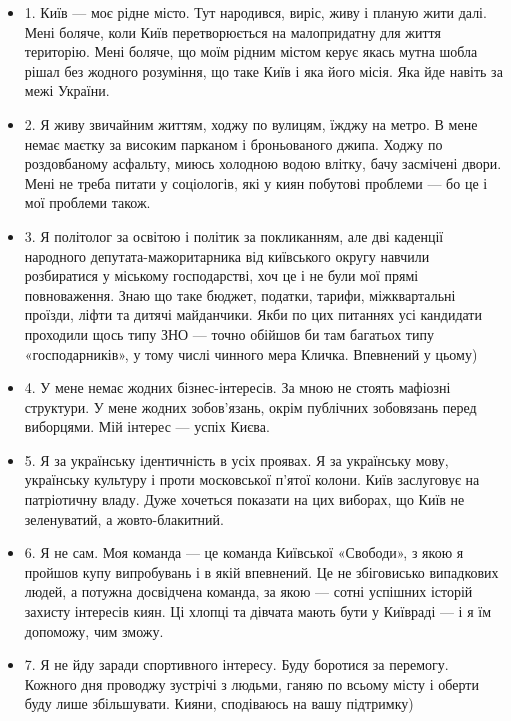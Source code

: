 \begin{itemize}
	
\item 1. Київ --- моє рідне місто. Тут народився, виріс, живу і планую жити далі. Мені
боляче, коли Київ перетворюється на малопридатну для життя територію. Мені
боляче, що моїм рідним містом керує якась мутна шобла рішал без жодного
розуміння, що таке Київ і яка його місія. Яка йде навіть за межі України. 

\item 2. Я живу звичайним життям, ходжу по вулицям, їжджу на метро. В мене немає
маєтку за високим парканом і броньованого джипа. Ходжу по роздовбаному
асфальту, миюсь холодною водою влітку, бачу засмічені двори. Мені не треба
питати у соціологів, які у киян побутові проблеми --- бо це і мої проблеми також. 

\item 3. Я політолог за освітою і політик за покликанням, але дві каденції народного
депутата-мажоритарника від київського округу навчили розбиратися у міському
господарстві, хоч це і не були мої прямі повноваження. Знаю що таке бюджет,
податки, тарифи, міжквартальні проїзди, ліфти та дитячі майданчики. Якби по цих
питаннях усі кандидати проходили щось типу ЗНО --- точно обійшов би там багатьох
типу «господарників», у тому числі чинного мера Кличка. Впевнений у цьому)

\item 4. У мене немає жодних бізнес-інтересів. За мною не стоять мафіозні структури.
У мене жодних зобов’язань, окрім публічних зобовязань перед виборцями. Мій
інтерес --- успіх Києва. 

\item 5. Я за українську ідентичність в усіх проявах. Я за українську мову,
українську культуру і проти московської п’ятої колони. Київ заслуговує на
патріотичну владу. Дуже хочеться показати на цих виборах, що Київ не
зеленуватий, а жовто-блакитний.

\item 6. Я не сам. Моя команда --- це команда Київської «Свободи», з якою я пройшов
купу випробувань і в якій впевнений. Це не збіговисько випадкових людей, а
потужна досвідчена команда, за якою --- сотні успішних історій захисту інтересів
киян. Ці хлопці та дівчата мають бути у Київраді --- і я їм допоможу, чим зможу. 

\item 7. Я не йду заради спортивного інтересу. Буду боротися за перемогу.
Кожного дня проводжу зустрічі з людьми, ганяю по всьому місту і оберти
буду лише збільшувати.  Кияни, сподіваюсь на вашу підтримку)

\end{itemize}
